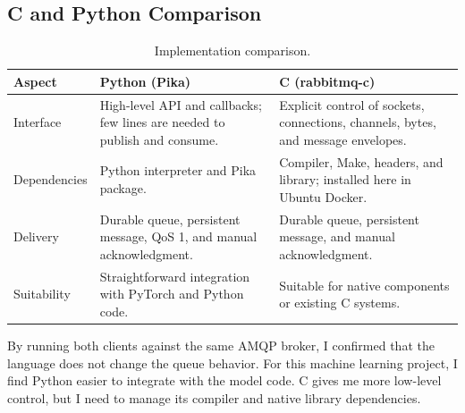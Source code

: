 ﻿\documentclass[11pt,a4paper]{article}
\begin{document}
\subsection{C and Python Comparison}\begin{table}[H]\small\centering\begin{tabularx}{\textwidth}{p{2.4cm}YY}\toprule
Aspect & Python (Pika) & C (rabbitmq-c) \\\midrule
Interface & High-level API and callbacks; few lines are needed to publish and consume. & Explicit control of sockets, connections, channels, bytes, and message envelopes. \\
Dependencies & Python interpreter and Pika package. & Compiler, Make, headers, and library; installed here in Ubuntu Docker. \\
Delivery & Durable queue, persistent message, QoS 1, and manual acknowledgment. & Durable queue, persistent message, and manual acknowledgment. \\
Suitability & Straightforward integration with PyTorch and Python code. & Suitable for native components or existing C systems. \\
\bottomrule\end{tabularx}\caption{Implementation comparison.}\end{table}
By running both clients against the same AMQP broker, I confirmed that the language does not change the queue behavior. For this machine learning project, I find Python easier to integrate with the model code. C gives me more low-level control, but I need to manage its compiler and native library dependencies.
\end{document}
